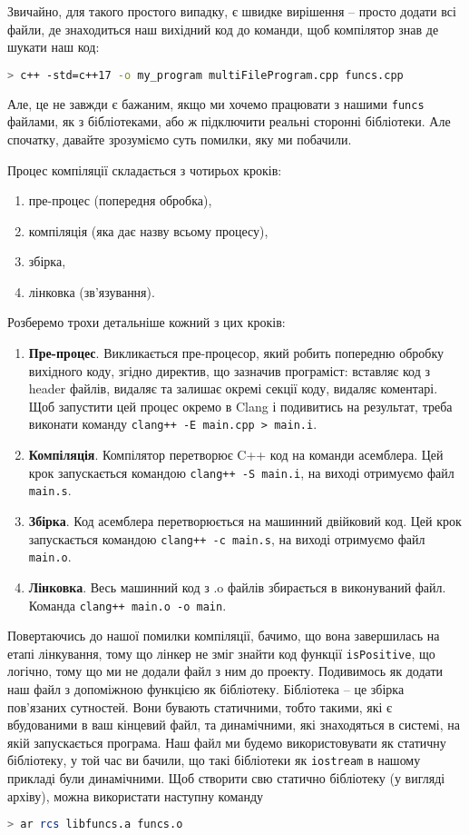 \documentclass[12pt]{article}
\begin{document}
	Звичайно, для такого простого випадку, є швидке вирішення -- просто додати всі файли, де знаходиться наш вихідний код до команди, щоб компілятор знав де шукати наш код:
	\begin{lstlisting}[language=bash]
		> c++ -std=c++17 -o my_program multiFileProgram.cpp funcs.cpp
	\end{lstlisting}

	Але, це не завжди є бажаним, якщо ми хочемо працювати з нашими \texttt{funcs} файлами, як з бібліотеками, або ж підключити реальні сторонні бібліотеки. Але спочатку, давайте зрозуміємо суть помилки, яку ми побачили.	
	
	Процес компіляції складається з чотирьох кроків:
	\begin{enumerate}
		\item пре-процес (попередня обробка),
		\item компіляція (яка дає назву всьому процесу),
		\item збірка,
		\item лінковка (зв'язування).
	\end{enumerate}
	Розберемо трохи детальніше кожний з цих кроків:
	\begin{enumerate}
		\item \textbf{Пре-процес}. Викликається пре-процесор, який робить попередню обробку вихідного коду, згідно директив, що зазначив програміст: вставляє код з header файлів, видаляє та залишає окремі секції коду, видаляє коментарі. Щоб запустити цей процес окремо в Clang і подивитись на результат, треба виконати команду \texttt{clang++ -E main.cpp > main.i}.
		\item \textbf{Компіляція}. Компілятор перетворює C++ код на команди асемблера. Цей крок запускається командою \texttt{clang++ -S main.i}, на виході отримуємо файл \texttt{main.s}.
		\item \textbf{Збірка}. Код асемблера перетворюється на машинний двійковий код. Цей крок запускається командою \texttt{clang++ -c main.s}, на виході отримуємо файл \texttt{main.o}.
		\item \textbf{Лінковка}. Весь машинний код з .o файлів збирається в виконуваний файл. Команда \texttt{clang++ main.o -o main}.
	\end{enumerate}

	Повертаючись до нашої помилки компіляції, бачимо, що вона завершилась на етапі лінкування, тому що лінкер не зміг знайти код функції \texttt{isPositive}, що логічно, тому що ми не додали файл з ним до проекту.
	Подивимось як додати наш файл з допоміжною функцією як бібліотеку. Бібліотека -- це збірка пов'язаних сутностей. Вони бувають статичними, тобто такими, які є вбудованими в ваш кінцевий файл, та динамічними, які знаходяться в системі, на якій запускається програма. Наш файл ми будемо використовувати як статичну бібліотеку, у той час ви бачили, що такі бібліотеки як \texttt{iostream} в нашому прикладі були динамічними.
	Щоб створити свю статично бібліотеку (у вигляді архіву), можна використати наступну команду
	\begin{lstlisting}[language=bash]
	> ar rcs libfuncs.a funcs.o
	\end{lstlisting}
\end{document}
